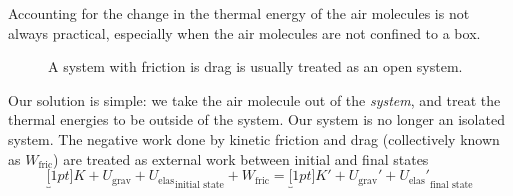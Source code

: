 Accounting for the change in the thermal energy of the air molecules is not
always practical, especially when the air molecules are not confined to a box.
\begin{figure}[ht]
  \centering
  \caption{A system with friction is drag is usually treated as an open
    system.}
  \label{fig:open-system}
\end{figure}
Our solution is simple: we take the air molecule out of the \emph{system},
and treat the thermal energies to be outside of the system. Our system is no
longer an isolated system. The negative work done by kinetic friction and drag
(collectively known as $W_\text{fric}$) are treated as external work between
initial and final states
\begin{equation}
  \underbracket[1pt]{
    K+U_\text{grav}+U_\text{elas}}_\text{initial state}+W_\text{fric}=
  \underbracket[1pt]{
    K'+U_\text{grav}'+U_\text{elas}'}_\text{final state}
\end{equation}

%
%  
%    




